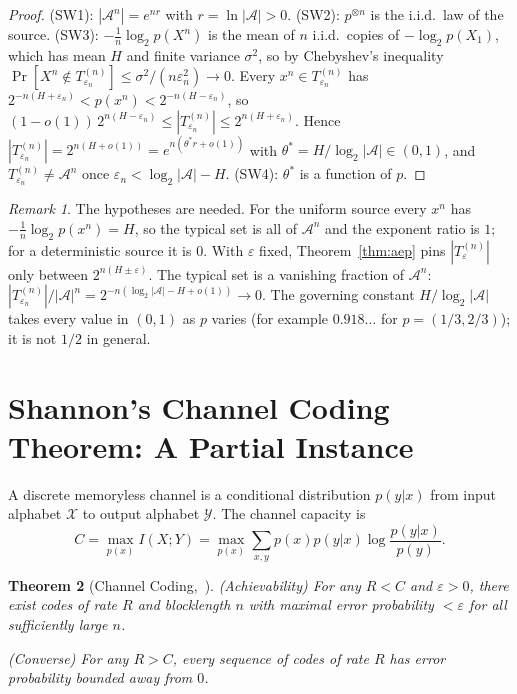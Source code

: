 \documentclass[12pt]{amsart}
\theoremstyle{plain}
\newtheorem{theorem}{Theorem}[section]
\theoremstyle{definition}
\theoremstyle{remark}
\newtheorem{remark}[theorem]{Remark}
\begin{document}
\begin{proof}
(SW1): $|\mathcal{A}^n| = e^{nr}$ with $r = \ln|\mathcal{A}| > 0$. (SW2):
$p^{\otimes n}$ is the i.i.d.\ law of the source. (SW3): $-\frac{1}{n}\log_2
p(X^n)$ is the mean of $n$ i.i.d.\ copies of $-\log_2 p(X_1)$, which has mean $H$
and finite variance $\sigma^2$, so by Chebyshev's inequality
$\Pr[X^n \notin T_{\varepsilon_n}^{(n)}] \leq \sigma^2/(n\varepsilon_n^2) \to 0$.
Every $x^n \in T_{\varepsilon_n}^{(n)}$ has
$2^{-n(H+\varepsilon_n)} < p(x^n) < 2^{-n(H-\varepsilon_n)}$, so
$(1-o(1))\,2^{n(H-\varepsilon_n)} \leq |T_{\varepsilon_n}^{(n)}| \leq
2^{n(H+\varepsilon_n)}$. Hence $|T_{\varepsilon_n}^{(n)}| = 2^{n(H+o(1))} =
e^{n(\theta^* r + o(1))}$ with $\theta^* = H/\log_2|\mathcal{A}| \in (0,1)$, and
$T_{\varepsilon_n}^{(n)} \neq \mathcal{A}^n$ once $\varepsilon_n <
\log_2|\mathcal{A}| - H$. (SW4): $\theta^*$ is a function of $p$.
\end{proof}

\begin{remark}
\label{rem:aep}
The hypotheses are needed. For the uniform source every $x^n$ has
$-\frac{1}{n}\log_2 p(x^n) = H$, so the typical set is all of $\mathcal{A}^n$ and
the exponent ratio is $1$; for a deterministic source it is $0$. With
$\varepsilon$ fixed, Theorem~\ref{thm:aep} pins $|T_\varepsilon^{(n)}|$ only
between $2^{n(H \pm \varepsilon)}$. The typical set is a vanishing fraction of
$\mathcal{A}^n$: $|T_{\varepsilon_n}^{(n)}|/|\mathcal{A}|^n =
2^{-n(\log_2|\mathcal{A}| - H + o(1))} \to 0$. The governing constant
$H/\log_2|\mathcal{A}|$ takes every value in $(0,1)$ as $p$ varies (for example
$0.918\ldots$ for $p = (1/3, 2/3)$); it is not $1/2$ in general.
\end{remark}

\section{Shannon's Channel Coding Theorem: A Partial Instance}

A discrete memoryless channel is a conditional distribution $p(y|x)$ from input
alphabet $\mathcal{X}$ to output alphabet $\mathcal{Y}$. The channel capacity is
\[
  C = \max_{p(x)} I(X;Y)
    = \max_{p(x)} \sum_{x,y} p(x)p(y|x) \log \frac{p(y|x)}{p(y)}.
\]

\begin{theorem}[Channel Coding,~{\cite[Ch.~7]{CoverThomas2006}}]
\label{thm:channel}
\emph{(Achievability)} For any $R < C$ and $\varepsilon > 0$, there exist codes
of rate $R$ and blocklength $n$ with maximal error probability $< \varepsilon$
for all sufficiently large $n$.

\emph{(Converse)} For any $R > C$, every sequence of codes of rate $R$ has error
probability bounded away from $0$.
\end{theorem}
\end{document}
